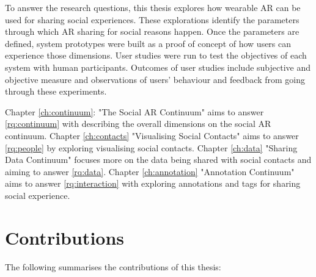 To answer the research questions, this thesis explores how wearable AR can be used for sharing social experiences. These explorations identify the parameters through which AR sharing for social reasons happen. Once the parameters are defined, system prototypes were built as a proof of concept of how users can experience those dimensions. User studies were run to test the objectives of each system with human participants. Outcomes of user studies include subjective and objective measure and observations of users' behaviour and feedback from going through these experiments. 

Chapter \ref{ch:continuum}: "The Social AR Continuum" aims to answer \ref{rq:continuum} with describing the overall dimensions on the social AR continuum. 
Chapter \ref{ch:contacts} "Visualising Social Contacts" aims to answer \ref{rq:people} by exploring visualising social contacts. 
Chapter \ref{ch:data} "Sharing Data Continuum" focuses more on the data being shared with social contacts and aiming to answer \ref{rq:data}.
Chapter \ref{ch:annotation} "Annotation Continuum" aims to answer \ref{rq:interaction} with exploring annotations and tags for sharing social experience. 

\section{Contributions}

The following summarises the contributions of this thesis: 

